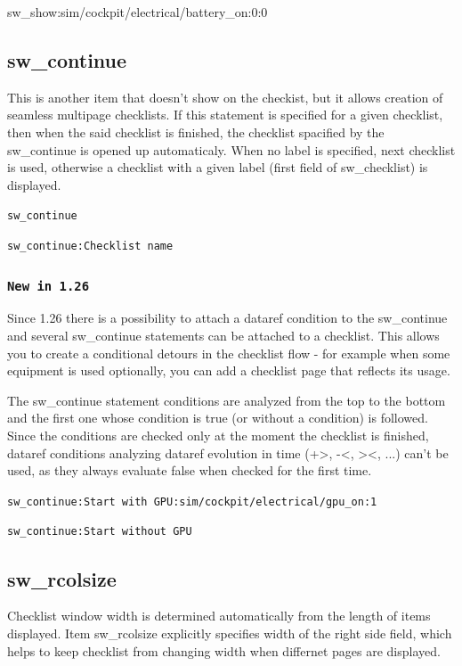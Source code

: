 \documentclass[11pt,parskip=half,a4paper]{scrartcl}
\newcommand\textstyleSourceText[1]{\texttt{#1}}
\begin{document}
sw\_show:sim/cockpit/electrical/battery\_on:0:0


\subsection[sw\_continue]{sw\_continue}
This is another item that doesn't show on the checkist, but it allows creation of {\textquotedbl}seamless{\textquotedbl}
multipage checklists. If this statement is specified for a given checklist, then when the said checklist is finished, the checklist spacified by the sw\_continue is opened up automaticaly. When no label is specified, next checklist is used, otherwise a checklist with a given label (first field of sw\_checklist) is displayed.

\textstyleSourceText{sw\_continue}

\textstyleSourceText{sw\_continue:Checklist name}

\subsubsection[New in 1.26]{\textstyleSourceText{New in 1.26}}
Since 1.26 there is a possibility to attach a dataref condition to the sw\_continue and several sw\_continue statements can be attached to a checklist. This allows you to create a conditional {\textquotedbl}detours{\textquotedbl} in the checklist flow - for example when some equipment is used optionally, you can add a checklist page that reflects its usage.

The sw\_continue statement conditions are analyzed from the top to the bottom and the first one whose condition is true (or without a condition) is followed. Since the conditions are checked only at the moment the checklist is finished, dataref conditions analyzing dataref evolution in time ({\textquotedbl}+{\textgreater}{\textquotedbl},
{\textquotedbl}-{\textless}{\textquotedbl}, {\textquotedbl}{\textgreater}{\textless}{\textquotedbl}, ...) can't be used, as they always evaluate false when checked for the first time.

{\ttfamily
\textstyleSourceText{sw\_continue:Start with GPU:sim/cockpit/electrical/gpu\_on:1}}

{\ttfamily
\textstyleSourceText{sw\_continue:Start without GPU}}

\subsection{sw\_rcolsize}
Checklist window width is determined automatically from the length of items displayed. Item sw\_rcolsize explicitly specifies width of the right side field, which helps to keep checklist from changing width when differnet pages are displayed.
\end{document}
